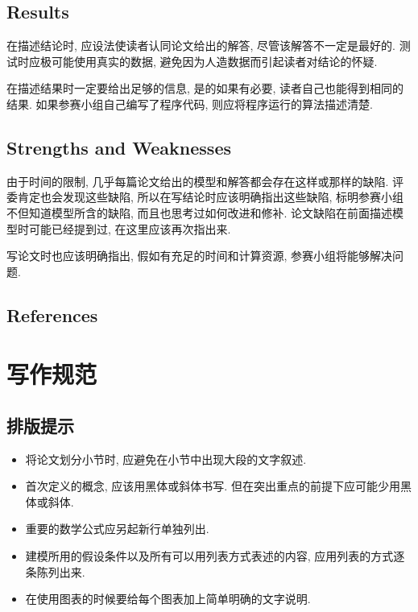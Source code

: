 \documentclass[openany]{ctexbook}
\begin{document}
    \section{Results}
    在描述结论时, 应设法使读者认同论文给出的解答, 尽管该解答不一定是最好的. 测试时应极可能使用真实的数据, 避免因为人造数据而引起读者对结论的怀疑.\par
    在描述结果时一定要给出足够的信息, 是的如果有必要, 读者自己也能得到相同的结果. 如果参赛小组自己编写了程序代码, 则应将程序运行的算法描述清楚.

    \section{Strengths and Weaknesses}
    由于时间的限制, 几乎每篇论文给出的模型和解答都会存在这样或那样的缺陷. 评委肯定也会发现这些缺陷, 所以在写结论时应该明确指出这些缺陷, 标明参赛小组不但知道模型所含的缺陷, 而且也思考过如何改进和修补. 论文缺陷在前面描述模型时可能已经提到过, 在这里应该再次指出来.\par
    写论文时也应该明确指出, 假如有充足的时间和计算资源, 参赛小组将能够解决问题.

    \section*{References}
    \lipsum[10]


\chapter{写作规范}
    \section{排版提示}
    \begin{itemize}
        \item 将论文划分小节时, 应避免在小节中出现大段的文字叙述.
        \item 首次定义的概念, 应该用黑体或斜体书写. 但在突出重点的前提下应可能少用黑体或斜体.
        \item 重要的数学公式应另起新行单独列出.
        \item 建模所用的假设条件以及所有可以用列表方式表述的内容, 应用列表的方式逐条陈列出来.
        \item 在使用图表的时候要给每个图表加上简单明确的文字说明.
    \end{itemize}
\end{document}
